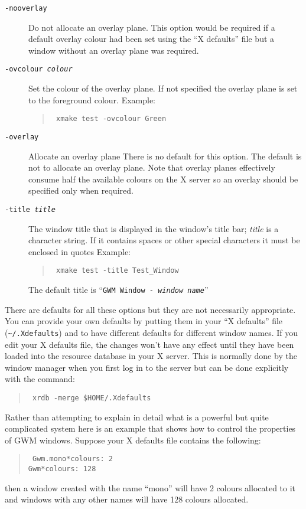 \begin{description}
\item[{\tt -nooverlay}] Do not allocate an overlay plane. This option
would be required if a default overlay colour had been set using the ``X
defaults'' file  but a window without an 
overlay plane was required.

\item[{\tt -ovcolour {\em colour}}]
Set the colour of the overlay plane. If not specified the overlay plane is set
to the foreground colour. Example:
\begin{quote}{\tt
xmake test -ovcolour Green}
\end{quote}

\item[{\tt -overlay}] Allocate an overlay plane
There is no default for this option. The default is not to
allocate an overlay plane. Note that overlay planes effectively consume half
the available colours on the X server so an overlay should be specified only
when required.

\item[{\tt -title {\em title}}] The window title that is displayed in the
window's title bar;
{\em title} is a character string. If it contains spaces or other
special characters it must be enclosed in quotes 
Example:
\begin{quote}{\tt
xmake test -title Test\_Window}
\end{quote}
The default title is ``{\tt{GWM Window - }{\em window name}}''

\end{description}

\label{xdefaults}There are defaults 
for all these options but they are not 
necessarily appropriate. You can provide your own defaults by putting
them in your ``X defaults'' file ({\tt\~{}/.Xdefaults}) 
and to have different defaults for different window names. If you 
edit your X defaults file, the changes won't have any effect until they
have been loaded into the resource database in your X server. This is normally
done by the window manager when you first log in to the server but can 
be done explicitly with the command:
\begin{quote}{\tt
xrdb -merge \$HOME/.Xdefaults}
\end{quote}

Rather than attempting to explain in detail what is a powerful but quite
complicated system here is an example that shows how to control the properties
of GWM windows. Suppose your X defaults file contains the following:
\begin{quote}{\tt
Gwm.mono*colours: 2\\
Gwm*colours: 128}
\end{quote}
then a window created with the name ``mono'' will have 2 colours allocated to
it and windows with any other names will have 128 colours allocated.

